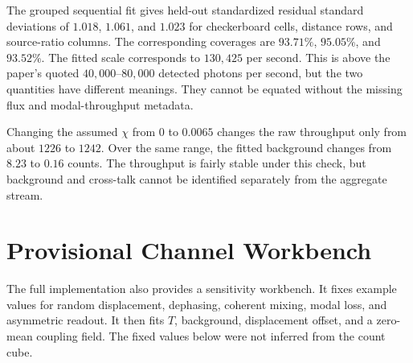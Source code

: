 The grouped sequential fit gives held-out standardized residual standard deviations of $1.018$, $1.061$, and $1.023$ for checkerboard cells, distance rows, and source-ratio columns.  The corresponding coverages are $93.71\%$, $95.05\%$, and $93.52\%$.  The fitted scale corresponds to $130{,}425$ per second.  This is above the paper's quoted $40{,}000$--$80{,}000$ detected photons per second, but the two quantities have different meanings.  They cannot be equated without the missing flux and modal-throughput metadata.

Changing the assumed $\chi$ from $0$ to $0.0065$ changes the raw throughput only from about $1226$ to $1242$.  Over the same range, the fitted background changes from $8.23$ to $0.16$ counts.  The throughput is fairly stable under this check, but background and cross-talk cannot be identified separately from the aggregate stream.

\section{Provisional Channel Workbench}

The full implementation also provides a sensitivity workbench.  It fixes example values for random displacement, dephasing, coherent mixing, modal loss, and asymmetric readout.  It then fits $T$, background, displacement offset, and a zero-mean coupling field.  The fixed values below were not inferred from the count cube.

